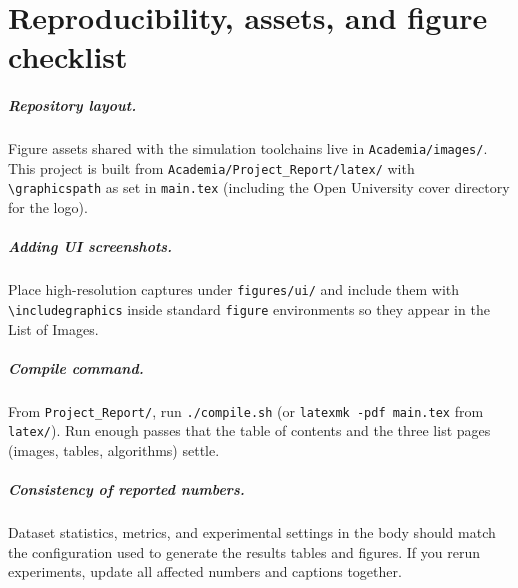 \chapter{Reproducibility, assets, and figure checklist}
\label{ap:repro}

\paragraph{Repository layout.}
Figure assets shared with the simulation toolchains live in \texttt{Academia/images/}. This project is built from \texttt{Academia/Project\_Report/latex/} with \verb|\graphicspath| as set in \texttt{main.tex} (including the Open University cover directory for the logo).

\paragraph{Adding UI screenshots.}
Place high-resolution captures under \texttt{figures/ui/} and include them with \verb|\includegraphics| inside standard \verb|figure| environments so they appear in the List of Images.

\paragraph{Compile command.}
From \texttt{Project\_Report/}, run \verb|./compile.sh| (or \verb|latexmk -pdf main.tex| from \texttt{latex/}). Run enough passes that the table of contents and the three list pages (images, tables, algorithms) settle.

\paragraph{Consistency of reported numbers.}
Dataset statistics, metrics, and experimental settings in the body should match the configuration used to generate the results tables and figures. If you rerun experiments, update all affected numbers and captions together.
